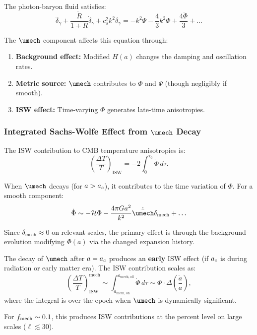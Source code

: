 The photon-baryon fluid satisfies:
\begin{equation}
\ddot{\delta}_\gamma + \frac{\dot{R}}{1+R}\dot{\delta}_\gamma + c_s^2 k^2 \delta_\gamma = -k^2\Psi - \frac{4}{3}k^2\Phi + \frac{4\ddot{\Phi}}{3} + \ldots
\end{equation}

The $\umech$ component affects this equation through:
\begin{enumerate}
\item \textbf{Background effect:} Modified $H(a)$ changes the damping and oscillation rates.
\item \textbf{Metric source:} $\umech$ contributes to $\Phi$ and $\Psi$ (though negligibly if smooth).
\item \textbf{ISW effect:} Time-varying $\Phi$ generates late-time anisotropies.
\end{enumerate}

\subsubsection{Integrated Sachs-Wolfe Effect from $\umech$ Decay}

The ISW contribution to CMB temperature anisotropies is:
\begin{equation}
\label{eq:ISW}
\left(\frac{\Delta T}{T}\right)_{\mathrm{ISW}} = -2\int_0^{\tau_0} \dot{\Phi} \, d\tau.
\end{equation}

When $\umech$ decays (for $a > a_c$), it contributes to the time variation of $\Phi$. For a smooth component:
\begin{equation}
\dot{\Phi} \sim -\mathcal{H}\Phi - \frac{4\pi G a^2}{k^2}\dot{\bar{\umech}}\delta_{\mathrm{mech}} + \ldots
\end{equation}

Since $\delta_{\mathrm{mech}} \approx 0$ on relevant scales, the primary effect is through the background evolution modifying $\Phi(a)$ via the changed expansion history.

\begin{proposition}
\label{prop:ISW_mech}
The decay of $\umech$ after $a = a_c$ produces an \textbf{early} ISW effect (if $a_c$ is during radiation or early matter era). The ISW contribution scales as:
\begin{equation}
\left(\frac{\Delta T}{T}\right)_{\mathrm{ISW}}^{\mathrm{mech}} \sim \int_{a_{\mathrm{mech,on}}}^{a_{\mathrm{mech,off}}} \dot{\Phi} \, d\tau \sim \Phi \cdot \Delta\left(\frac{\dot{a}}{a}\right),
\end{equation}
where the integral is over the epoch when $\umech$ is dynamically significant.

For $f_{\mathrm{mech}} \sim 0.1$, this produces ISW contributions at the percent level on large scales ($\ell \lesssim 30$).
\end{proposition}


